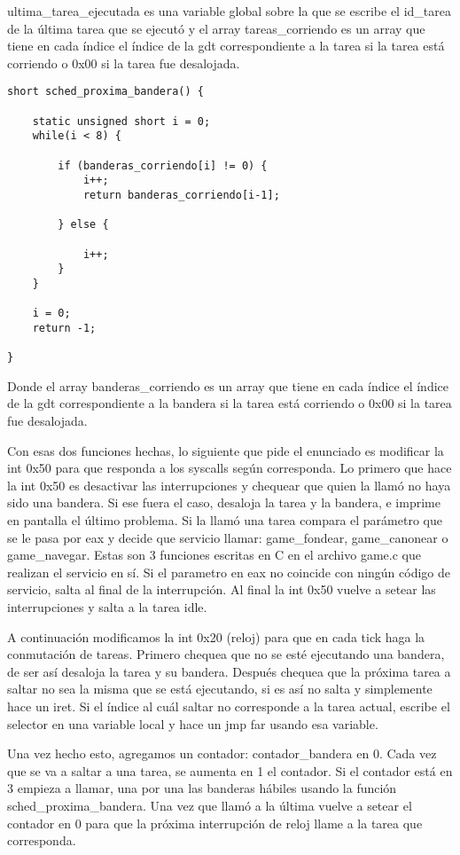 \documentclass[10pt, a4paper]{article}
\begin{document}
ultima\_tarea\_ejecutada es una variable global sobre la que se escribe el id\_tarea de la \'ultima tarea que se ejecut\'o y el array tareas\_corriendo es un array que
tiene en cada \'indice el \'indice de la gdt correspondiente a la tarea si la tarea est\'a corriendo o 0x00 si la tarea fue desalojada.

\begin{lstlisting}
short sched_proxima_bandera() {

	static unsigned short i = 0;
	while(i < 8) {

		if (banderas_corriendo[i] != 0) {
			i++;
			return banderas_corriendo[i-1]; 
	
		} else {
	
			i++;
		}
	}
	
	i = 0;
	return -1;
	
}

\end{lstlisting}

Donde el array banderas\_corriendo es un array que tiene en cada \'indice el \'indice de la gdt correspondiente a la bandera si la tarea est\'a corriendo o 0x00 si la tarea fue desalojada.

Con esas dos funciones hechas, lo siguiente que pide el enunciado es modificar la int 0x50 para que responda a los syscalls seg\'un corresponda. Lo primero que hace la int 0x50 es desactivar
las interrupciones y chequear que quien la llam\'o no haya sido una bandera. Si ese fuera el caso, desaloja la tarea y la bandera, e imprime en pantalla el \'ultimo problema. Si la llam\'o una
tarea compara el par\'ametro que se le pasa por eax y decide que servicio llamar: game\_fondear, game\_canonear o game\_navegar. Estas son 3 funciones escritas en C en el archivo game.c que
realizan el servicio en s\'i. Si el parametro en eax no coincide con ning\'un c\'odigo de servicio, salta al final de la interrupci\'on. Al final la int 0x50 vuelve a setear las interrupciones
y salta a la tarea idle.

A continuaci\'on modificamos la int 0x20 (reloj) para que en cada tick haga la conmutaci\'on de tareas. Primero chequea que no se est\'e ejecutando una bandera, de ser as\'i desaloja la tarea 
y su bandera. Despu\'es chequea que la pr\'oxima tarea a saltar no sea la misma que se est\'a ejecutando, si es as\'i no salta y simplemente hace un iret. Si el \'indice al cu\'al saltar no
corresponde a la tarea actual, escribe el selector en una variable local y hace un jmp far usando esa variable.

Una vez hecho esto, agregamos un contador: contador\_bandera en 0. Cada vez que se va a saltar a una tarea, se aumenta en 1 el contador. Si el contador est\'a en 3 empieza a llamar, una por una
las banderas h\'abiles usando la funci\'on sched\_proxima\_bandera. Una vez que llam\'o a la \'ultima vuelve a setear el contador en 0 para que la pr\'oxima interrupci\'on de reloj llame a la tarea
que corresponda.
\end{document}
